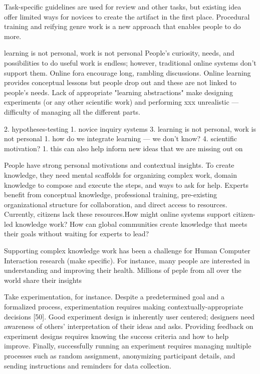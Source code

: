 Task-specific guidelines are used for review and other tasks, but existing idea offer limited ways for novices to create the artifact in the first place. Procedural training and reifying genre work is a new approach that enables people to do more. 


learning is not personal, work is not personal
People’s curiosity, needs, and possibilities to do useful work is endless; however, traditional online systems don’t support them. Online fora encourage long, rambling discussions. Online learning provides conceptual lessons but people drop out and these are not linked to people’s needs. Lack of appropriate "learning abstractions" make designing experiments (or any other scientific work) and performing xxx unrealistic — difficulty of managing all the different parts. 



2. hypotheses-testing
    1. novice inquiry systems
3. learning is not personal, work is not personal
    1. how do we integrate learning — we don’t know?
4. scientific motivation?
    1. this can also help inform new ideas that we are missing out on

People have strong personal motivations and contextual insights. To create knowledge, they need mental scaffolds for organizing complex work, domain knowledge to compose and execute the steps, and ways to ask for help. Experts benefit from conceptual knowledge, professional training, pre-existing organizational structure for collaboration, and direct access to resources. Currently, citizens lack these resources.How might online systems support citizen-led knowledge work? How can global communities create knowledge that meets their goals without waiting for experts to lead?

Supporting complex knowledge work has been a challenge for Human Computer Interaction research (make specific). For instance, many people are interested in understanding and improving their health. Millions of peple from all over the world share their insights 

Take experimentation, for instance. Despite a predetermined goal and a formalized process,
experimentation requires making contextually-appropriate
decisions [50]. Good experiment design is inherently user
centered; designers need awareness of others’ interpretation
of their ideas and asks. Providing feedback on experiment
designs requires knowing the success criteria and how to
help improve. Finally, successfully running an experiment
requires managing multiple processes such as random
assignment, anonymizing participant details, and sending
instructions and reminders for data collection.

